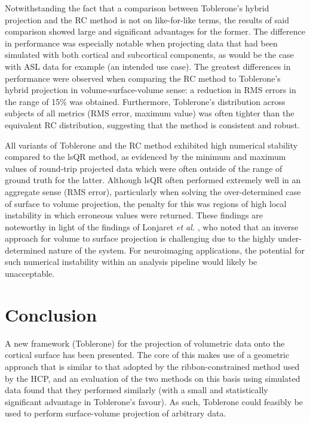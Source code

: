 \documentclass[12pt]{report}
\begin{document}
Notwithstanding the fact that a comparison between Toblerone's hybrid projection and the RC method is not on like-for-like terms, the results of said comparison showed large and significant advantages for the former. The difference in performance was especially notable  when projecting data that had been simulated with both cortical and subcortical components, as would be the case with ASL data for example (an intended use case). The greatest differences in performance were observed when comparing the RC method to Toblerone's hybrid projection in volume-surface-volume sense: a reduction in RMS errors in the range of 15\% was obtained. Furthermore, Toblerone's distribution across subjects of all metrics (RMS error, maximum value) was often tighter than the equivalent RC distribution, suggesting that the method is consistent and robust. 

All variants of Toblerone and the RC method exhibited high numerical stability compared to the lsQR method, as evidenced by the minimum and maximum values of round-trip projected data which were often outside of the range of ground truth for the latter. Although lsQR often performed extremely well in an aggregate sense (RMS error), particularly when solving the over-determined case of surface to volume projection, the penalty for this was regions of high local instability in which erroneous values were returned. These findings are noteworthy in light of the findings of Lonjaret \textit{et al.} \cite{Lonjaret2017}, who noted that an inverse approach for volume to surface projection is challenging due to the highly under-determined nature of the system. For neuroimaging applications, the potential for such numerical instability within an analysis pipeline would likely be unacceptable. 

\section{Conclusion}

A new framework (Toblerone) for the projection of volumetric data onto the cortical surface has been presented. The core of this makes use of a geometric approach that is similar to that adopted by the ribbon-constrained method used by the HCP, and an evaluation of the two methods on this basis using simulated data found that they performed similarly (with a small and statistically significant advantage in Toblerone's favour). As such, Toblerone could feasibly be used to perform surface-volume projection of arbitrary data. 
\end{document}
